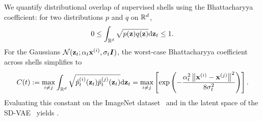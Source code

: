 We quantify distributional overlap of supervised shells using the Bhattacharyya coefficient: for two distributions $p$ and $q$ on $\mathbb{R}^d$,
\begin{equation*}
    0\le \int_{\mathbb{R}^d} \sqrt{p({\mathbf{z}})q({\mathbf{z}})}\mathrm{d}{\mathbf{z}}_t \le 1.
\end{equation*}
For the Gaussians ${\mathcal{N}}({\mathbf{z}}_t;\alpha_t {\mathbf{x}}^{(i)},\sigma_t{\bm{I}})$, the worst-case Bhattacharyya coefficient across shells simplifies to
\begin{equation*}
     C(t) := \max_{i \neq j} \int_{\mathbb{R}^d} \sqrt{\hat{p}_t^{(i)}({\mathbf{z}}_t) \hat{p}_t^{(j)}({\mathbf{z}}_t)} \mathrm{d}{\mathbf{z}}_t = \max_{i \neq j}\left[\exp\left(-\frac{\alpha_t^2 \left\|{\mathbf{x}}^{(i)}-{\mathbf{x}}^{(j)}\right\|^2}{8\sigma_t^2}\right)\right].
\end{equation*}
Evaluating this constant on the ImageNet dataset~\citep{deng2009imagenet} and in the latent space of the SD-VAE~\citep{rombach2022high} yields .
